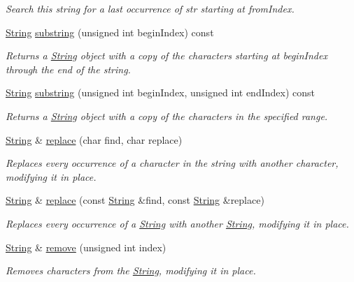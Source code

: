 \begin{DoxyCompactItemize}
\begin{DoxyCompactList}\small\item\em Search this string for a last occurrence of str starting at from\+Index. \end{DoxyCompactList}\item 
\hyperlink{class_string}{String} \hyperlink{class_string_a36b10b81c1556de6e5c63fd060347f30}{substring} (unsigned int begin\+Index) const
\begin{DoxyCompactList}\small\item\em Returns a \hyperlink{class_string}{String} object with a copy of the characters starting at begin\+Index through the end of the string. \end{DoxyCompactList}\item 
\hyperlink{class_string}{String} \hyperlink{class_string_ad04cc1c85089951dc3a182b4397a9f40}{substring} (unsigned int begin\+Index, unsigned int end\+Index) const
\begin{DoxyCompactList}\small\item\em Returns a \hyperlink{class_string}{String} object with a copy of the characters in the specified range. \end{DoxyCompactList}\item 
\hyperlink{class_string}{String} \& \hyperlink{class_string_a3452044f5ec9ffba3dcc3c2b355b769f}{replace} (char find, char replace)
\begin{DoxyCompactList}\small\item\em Replaces every occurrence of a character in the string with another character, modifying it in place. \end{DoxyCompactList}\item 
\hyperlink{class_string}{String} \& \hyperlink{class_string_a6b91a0ceae7dd3f86b952ce2cebf783c}{replace} (const \hyperlink{class_string}{String} \&find, const \hyperlink{class_string}{String} \&replace)
\begin{DoxyCompactList}\small\item\em Replaces every occurrence of a \hyperlink{class_string}{String} with another \hyperlink{class_string}{String}, modifying it in place. \end{DoxyCompactList}\item 
\hyperlink{class_string}{String} \& \hyperlink{class_string_ae65cdfb8e1bf70458d3d699c27754a9b}{remove} (unsigned int index)
\begin{DoxyCompactList}\small\item\em Removes characters from the \hyperlink{class_string}{String}, modifying it in place. \end{DoxyCompactList}\item 

\end{DoxyCompactItemize}
